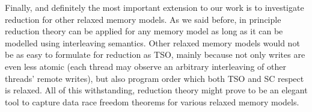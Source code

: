 \documentclass[preprint,9pt]{sigplanconf}
\begin{document}
Finally, and definitely the most important extension to our work is to investigate reduction for other relaxed memory models.
As we said before, in principle reduction theory can be applied for any memory model as long as it can be modelled using interleaving semantics.
Other relaxed memory models would not be as easy to formulate for reduction as TSO, mainly because not only writes are even less atomic (each thread may observe an arbitrary interleaving of other threads' remote writes), but also program order which both TSO and SC respect is relaxed.
All of this withstanding, reduction theory might prove to be an elegant tool to capture data race freedom theorems for various relaxed memory models.





\end{document}
